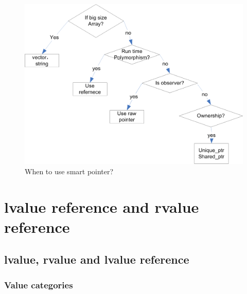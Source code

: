 \documentclass[a4paper,11pt,twoside]{book}
\begin{document}
\begin{itemize}
\begin{figure}[h!]
	\centering
	\includegraphics[width=0.75\linewidth]{pics/smartPointer.png}
	\caption{When to use smart pointer?}
	\label{fig:smartpointer}
\end{figure}
\end{itemize}

\chapter{lvalue reference and rvalue reference}
\section{lvalue, rvalue and lvalue reference}
\subsection{Value categories}
\end{document}
